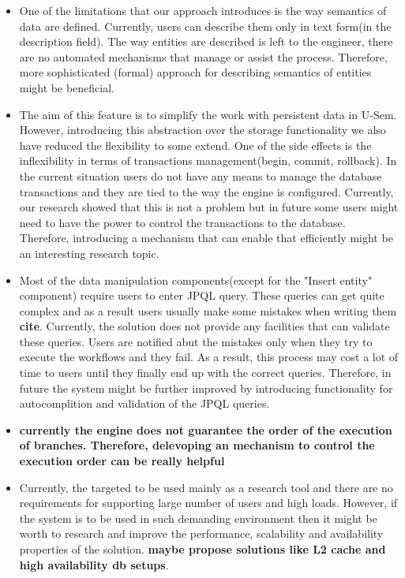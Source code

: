 \documentclass[a4paper, notitlepage]{article}
\begin{document}
\begin{itemize}
\item One of the limitations that our approach introduces is the way semantics of data are defined. Currently, users can describe them only in text form(in the description field). The way entities are described is left to the engineer, there are no automated mechanisms that manage or assist the process. Therefore, more sophisticated (formal) approach for describing semantics of entities might be beneficial.

\item The aim of this feature is to simplify the work with persistent data in U-Sem. However, introducing this abstraction over the storage functionality we also have reduced the flexibility to some extend. One of the side effects is the inflexibility in terms of transactions management(begin, commit, rollback). In the current situation users do not have any means to manage the database transactions and they are tied to the way the engine is configured. Currently, our research showed that this is not a problem but in future some users might need to have the power to control the transactions to the database. Therefore, introducing a mechanism that can enable that efficiently might be an interesting research topic.

\item Most of the data manipulation components(except for the "Insert entity" component) require users to enter JPQL query. These queries can get quite complex and as a result users usually make some mistakes when writing them \textbf{cite}. Currently, the solution does not provide any facilities that can validate these queries. Users are notified abut the mistakes only when they try to execute the workflows and they fail. As a result, this process may cost a lot of time to users until they finally end up with the correct queries. Therefore, in future the system might be further improved by introducing functionality for autocomplition and validation of the JPQL queries.

\item \textbf{currently the engine does not guarantee the order of the execution of branches. Therefore, delevoping an mechanism to control the execution order can be really helpful}

\item Currently, the targeted to be used mainly as a research tool and there are no requirements for supporting large number of users and high loads. However, if the system is to be used in such demanding environment then it might be worth to research and improve the performance, scalability and availability properties of the solution. \textbf{maybe propose solutions like L2 cache and high availability db setups}. 

\end{itemize}
\end{document}
